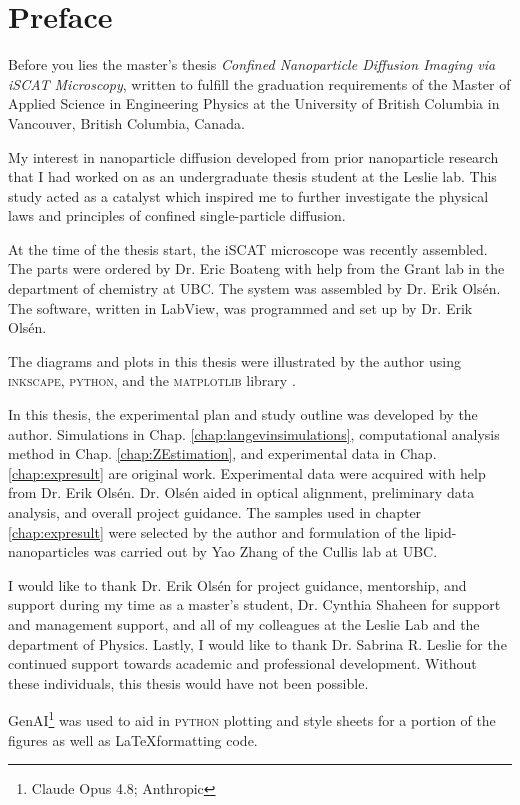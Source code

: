 \newpage
\section*{Preface}

Before you lies the master's thesis \textit{Confined Nanoparticle Diffusion
Imaging via iSCAT Microscopy}, written to fulfill the graduation requirements of the Master of Applied Science in Engineering Physics at the University of British Columbia in Vancouver, British Columbia, Canada. 

My interest in nanoparticle diffusion developed from prior nanoparticle research that I had worked on as an undergraduate thesis student at the Leslie lab. This study acted as a catalyst which inspired me to further investigate the physical laws and principles of confined single-particle diffusion. 

At the time of the thesis start, the iSCAT microscope was recently assembled. The parts were ordered by Dr. Eric Boateng with help from the Grant lab in the department of chemistry at UBC. The system was assembled by Dr. Erik Olsén. The software, written in LabView, was programmed and set up by Dr. Erik Olsén. 

The diagrams and plots in this thesis were illustrated by the author using \textsc{inkscape}, \textsc{python}, and the \textsc{matplotlib} library \cite{inkscape, python3, Hunter:2007}.

In this thesis, the experimental plan and study outline was developed by the author. Simulations in Chap. \ref{chap:langevinsimulations}, computational analysis method in Chap. \ref{chap:ZEstimation}, and experimental data in Chap. \ref{chap:expresult} are original work. Experimental data were acquired with help from Dr. Erik Olsén. Dr. Olsén aided in optical alignment, preliminary data analysis, and overall project guidance. The samples used in chapter \ref{chap:expresult} were selected by the author and formulation of the lipid-nanoparticles was carried out by Yao Zhang of the Cullis lab at UBC. 

I would like to thank Dr. Erik Olsén for project guidance, mentorship, and support during my time as a master's student, Dr. Cynthia Shaheen for support and management support, and all of my colleagues at the Leslie Lab and the department of Physics. Lastly, I would like to thank Dr. Sabrina R. Leslie for the continued support towards academic and professional development. Without these individuals, this thesis would have not been possible.  


GenAI\footnote{Claude Opus 4.8; Anthropic} was used to aid in \textsc{python} plotting and style sheets for a portion of the figures as well as \LaTeX \space formatting code.  